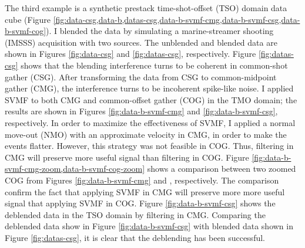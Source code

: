 The third example is a synthetic prestack time-shot-offset (TSO) domain data cube (Figure \ref{fig:data-csg,data-b,datas-csg,data-b-svmf-cmg,data-b-svmf-csg,data-b-svmf-cog}).  I blended the data by simulating a  marine-streamer  shooting (IMSSS) acquisition with two sources.  The unblended and blended data are shown in Figures \ref{fig:data-csg} and \ref{fig:datas-csg}, respectively. Figure \ref{fig:datas-csg} shows that the blending interference turns to be coherent in common-shot gather (CSG). After transforming the data from CSG to common-midpoint gather (CMG), the interference turns to be incoherent spike-like noise. I applied SVMF to both CMG and common-offset gather (COG) in the TMO domain; the results are shown in Figures \ref{fig:data-b-svmf-cmg} and \ref{fig:data-b-svmf-csg}, respectively. In order to maximize the effectiveness of SVMF, I applied a normal move-out (NMO) with an approximate velocity in CMG, in order to make the events flatter. However, this strategy was not feasible in COG. Thus, filtering in CMG will preserve more useful signal than filtering in COG. Figure \ref{fig:data-b-svmf-cmg-zoom,data-b-svmf-cog-zoom} shows a comparison between two zoomed COG from Figures \ref{fig:data-b-svmf-cmg} and \old{\ref{fig:data-b-svmf-cmg}}\new{\ref{fig:data-b-svmf-cog}}, respectively. The comparison confirm the fact that applying SVMF in CMG will preserve more more useful signal that applying SVMF in COG. Figure \ref{fig:data-b-svmf-csg} shows the deblended data in the TSO domain by filtering in CMG. Comparing the deblended data show in Figure \ref{fig:data-b-svmf-csg} with blended data shown in Figure \ref{fig:datas-csg}, it is clear that the deblending has been successful. 


